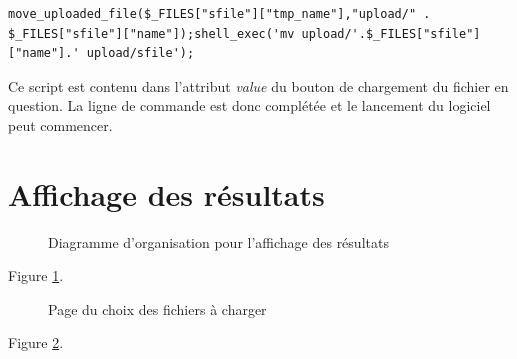 \begin{DDbox}{\linewidth}
\begin{lstlisting}
move_uploaded_file($_FILES["sfile"]["tmp_name"],"upload/" . $_FILES["sfile"]["name"]);shell_exec('mv upload/'.$_FILES["sfile"]["name"].' upload/sfile');
\end{lstlisting}
\end{DDbox}

Ce script est contenu dans l'attribut \textit{value} du bouton de chargement du fichier en question. La ligne de commande est donc complétée et le lancement du logiciel peut commencer. 

\section{Affichage des résultats}

\begin{figure}[!ht]
	\begin{center}
		\caption{Diagramme d'organisation pour l'affichage des résultats}
  		\label{DiagResults}
  	\end{center}	
\end{figure}

Figure \ref{DiagResults}. 

\begin{figure}[!ht]
	\begin{center}
		\caption{Page du choix des fichiers à charger}
  		\label{choix}
  	\end{center}	
\end{figure}

Figure \ref{choix}. 
